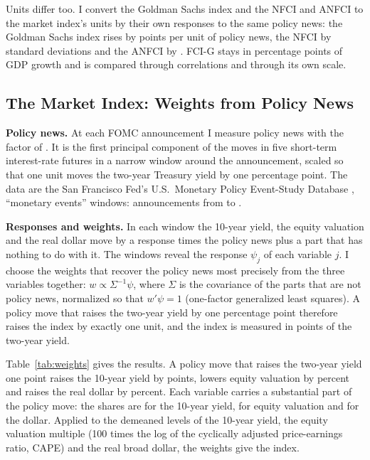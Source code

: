\documentclass[11pt]{article}
\begin{document}
Units differ too. I convert the Goldman Sachs index and the NFCI and ANFCI to the market index's units by their own responses to the same policy news: the Goldman Sachs index rises by  points per unit of policy news, the NFCI by  standard deviations and the ANFCI by . FCI-G stays in percentage points of GDP growth and is compared through correlations and through its own scale.

\subsection{The Market Index: Weights from Policy News}\label{sec:market}
\textbf{Policy news.} At each FOMC announcement I measure policy news with the factor of \citet{nakamura2018}. It is the first principal component of the moves in five short-term interest-rate futures in a narrow window around the announcement, scaled so that one unit moves the two-year Treasury yield by one percentage point. The data are the San Francisco Fed's U.S.\ Monetary Policy Event-Study Database \citep{acosta2025}, ``monetary events'' windows:  announcements from  to .

\textbf{Responses and weights.} In each window the 10-year yield, the equity valuation and the real dollar move by a response times the policy news plus a part that has nothing to do with it. The windows reveal the response $\psi_j$ of each variable $j$. I choose the weights that recover the policy news most precisely from the three variables together: $w\propto\Sigma^{-1}\psi$, where $\Sigma$ is the covariance of the parts that are not policy news, normalized so that $w'\psi=1$ (one-factor generalized least squares). A policy move that raises the two-year yield by one percentage point therefore raises the index by exactly one unit, and the index is measured in points of the two-year yield.

Table~\ref{tab:weights} gives the results. A policy move that raises the two-year yield one point raises the 10-year yield by  points, lowers equity valuation by  percent and raises the real dollar by  percent. Each variable carries a substantial part of the policy move: the shares are  for the 10-year yield,  for equity valuation and  for the dollar. Applied to the demeaned levels of the 10-year yield, the equity valuation multiple (100 times the log of the cyclically adjusted price-earnings ratio, CAPE) and the real broad dollar, the weights give the index.
\end{document}
